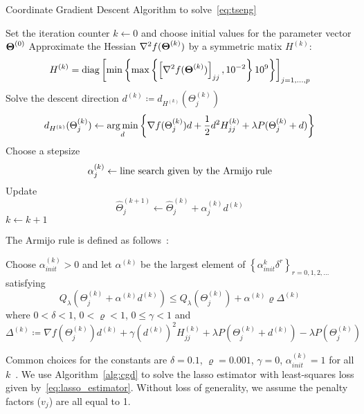 \begin{algorithm}[htbp]
	\caption{Coordinate Gradient Descent Algorithm to solve~\eqref{eq:tseng}} \label{alg:litreviewcgd}
\begin{algorithmic}[1]
\State Set the iteration counter $k \leftarrow 0$ and choose initial values for the parameter vector $\boldsymbol{\Theta}^{(0)}$
\Repeat
\State	Approximate the Hessian $\nabla^2 f(\boldsymbol{\Theta}^{(k)})$ by a symmetric matix $H^{(k)}$:
		\begin{equation}
		H^{(k)} = \operatorname{diag} \left[ \min \left\lbrace \max \left\lbrace \left[ \nabla^2 f(\boldsymbol{\Theta}^{(k)})\right] _{jj}, 10^{-2} \right\rbrace 10^{9} \right\rbrace\right]_{j = 1, \ldots, p} \label{eq:Hk-litreview}
		\end{equation}
\State Solve the descent direction $d^{(k)} \coloneqq d_{H^{(k)}}(\Theta_{j}^{(k)})$ \;
\begin{equation}
	d_{H^{(k)}}(\Theta_{j}^{(k)}) \leftarrow \operatorname*{arg\,min}_{d} \left\lbrace \nabla f(\Theta_{j}^{(k)}) d + \frac{1}{2} d^2 H^{(k)}_{j j} + \lambda P(\Theta_{j}^{(k)} + d) \right\rbrace \label{eq:descentdirection-litreview}
\end{equation}
\State	Choose a stepsize\;
	\begin{equation*}
	\alpha_j^{(k)} \leftarrow \textrm{{line search given by the Armijo rule}}
	\end{equation*}
\State	Update
	\begin{equation*}
	\widehat{\Theta}_j^{(k+1)} \leftarrow \widehat{\Theta}_j^{(k)} + \alpha_j^{(k)}d^{(k)}
	\end{equation*}
\EndFor
\State $k \leftarrow k +1$

\State {}
\end{algorithmic}
\end{algorithm}

\FloatBarrier

The Armijo rule is defined as follows~\citep{tseng2009coordinate}:
\begin{tcolorbox}
	Choose $\alpha_{init}^{(k)}>0$ and let $\alpha^{(k)}$ be the largest element of $\left\lbrace \alpha_{init}^k \delta^r \right\rbrace_{r = 0,1,2,\ldots} $ satisfying
	\begin{equation}
	Q_{\lambda}(\Theta_j^{(k)} + \alpha^{(k)} d^{(k)}) \leq Q_{\lambda} (\Theta_j^{(k)}) + \alpha^{(k)}\varrho \Delta^{(k)}
	\end{equation}
	where $0 < \delta <1$, $0 < \varrho <1$, $0 \leq \gamma < 1$ and
	\begin{equation}
	\Delta^{(k)} \coloneqq \nabla f(\Theta_j^{(k)})d^{(k)} + \gamma (d^{(k)})^2 H^{(k)}_{jj} + \lambda P(\Theta_j^{(k)} + d^{(k)}) - \lambda P(\Theta_j^{(k)})
	\end{equation}
\end{tcolorbox}
Common choices for the constants are $\delta=0.1$, $\varrho=0.001$, $\gamma = 0$, $\alpha_{init}^{(k)} = 1$ for all $k$~\citep{bertsekas1999nonlinear}.
We use Algorithm~\ref{alg:cgd} to solve the lasso estimator with least-squares loss given by~\eqref{eq:lasso_estimator}. Without loss of generality, we assume the penalty factors ($v_j$) are all equal to 1. 


